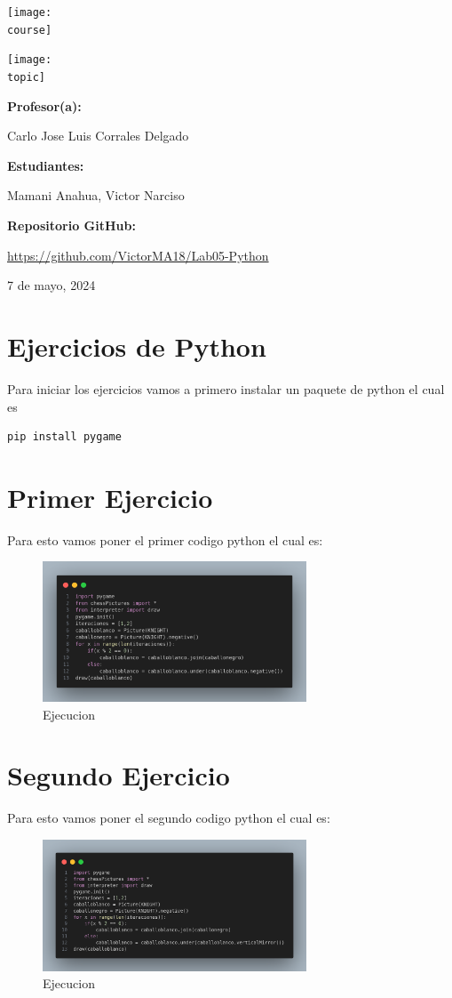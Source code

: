 \documentclass[10pt, a4paper]{article}
\newcommand{\course}{img/web_programming}
\newcommand{\topic}{img/Python.png}
\newcommand{\professor}{Carlo Jose Luis Corrales Delgado}
\newcommand{\students}{Mamani Anahua, Victor Narciso}
\newcommand{\github}{https://github.com/VictorMA18/Lab05-Python}
\newcommand{\mydate}{7 de mayo, 2024}
\begin{document}
\begin{titlepage}
	\centering
	\texttt{[image: \\course]} \par
  \vfill \vfill
	\texttt{[image: \\topic]}\par
  \vfill \vfill
  {\textbf{Profesor(a):} \par}
	\professor \vfill
  {\textbf{Estudiantes:} \par}
	\students \vfill
  {\textbf{Repositorio GitHub:} \par}
  \href{\github}{\github} \vfill
	{\large \mydate \par}
\end{titlepage}

\section{Ejercicios de Python}
Para iniciar los ejercicios vamos a primero instalar un paquete de python el cual es 
\begin{lstlisting}[language=bash]
  pip install pygame
\end{lstlisting} 

\section{Primer Ejercicio}
Para esto vamos poner el primer codigo python el cual es:  
\begin{figure}[H]
  \centering
  \includegraphics[width=0.7\textwidth]{img/Ej1.png}
  \caption{Ejecucion}
\end{figure}

\section{Segundo Ejercicio}
Para esto vamos poner el segundo codigo python el cual es:  
\begin{figure}[H]
  \centering
  \includegraphics[width=0.7\textwidth]{img/Ej2.png}
  \caption{Ejecucion}
\end{figure}
\end{document}

